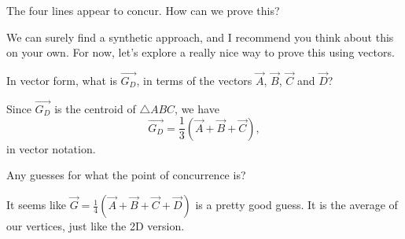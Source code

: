 The four lines appear to concur. How can we prove this?



We can surely find a synthetic approach, and I recommend you think about this on your own. For now, let's explore a really nice way to prove this using vectors.

In vector form, what is $\vec{G_D}$, in terms of the vectors $\vec{A}$, $\vec{B}$, $\vec{C}$ and $\vec{D}$?




Since $\vec{G_D}$ is the centroid of $\triangle ABC$, we have
$$ \vec{G_D} = \frac{1}{3}(\vec{A}+\vec{B}+\vec{C}) , $$
in vector notation.

Any guesses for what the point of concurrence is?









It seems like $\vec{G}=\frac{1}{4}(\vec{A}+\vec{B}+\vec{C}+\vec{D})$ is a pretty good guess. It is the average of our vertices, just like the 2D version.

